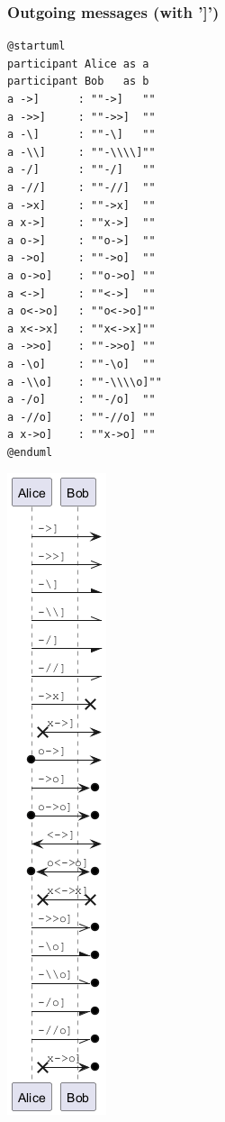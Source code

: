 \subsubsection{Outgoing messages (with ']')}
\begin{verbatim}
@startuml
participant Alice as a
participant Bob   as b
a ->]      : ""->]   ""
a ->>]     : ""->>]  ""
a -\]      : ""-\]   ""
a -\\]     : ""-\\\\]""
a -/]      : ""-/]   ""
a -//]     : ""-//]  ""
a ->x]     : ""->x]  ""
a x->]     : ""x->]  ""
a o->]     : ""o->]  ""
a ->o]     : ""->o]  ""
a o->o]    : ""o->o] ""
a <->]     : ""<->]  ""
a o<->o]   : ""o<->o]""
a x<->x]   : ""x<->x]""
a ->>o]    : ""->>o] ""
a -\o]     : ""-\o]  ""
a -\\o]    : ""-\\\\o]""
a -/o]     : ""-/o]  ""
a -//o]    : ""-//o] ""
a x->o]    : ""x->o] ""
@enduml
\end{verbatim}
\begin{center}
\includegraphics[scale=0.60]{imgw/img-2158c64e14946b6b276a06085e4a8a37.png}
\end{center}


